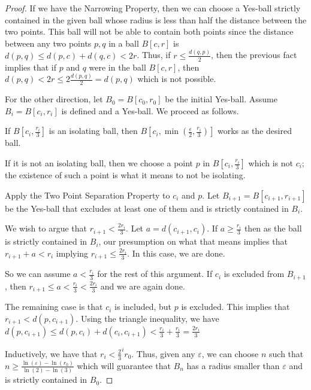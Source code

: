 \documentclass[12pt]{article}
\begin{document}
\begin{proof}

If we have the Narrowing Property, then we can choose a Yes-ball strictly contained in the given ball whose radius is less than half the distance between the two points. This ball will not be able to contain both points since the distance between any two points $p, q$ in a ball $B[c, r]$ is $d(p,q) \leq d(p, c) + d(q,c) < 2r$. Thus, if $ r \leq \frac{d(q,p)}{2}$, then the previous fact implies that if $p$ and $q$ were in the ball $B[c, r]$, then $d(p,q) < 2 r \leq 2\frac{d(p,q)}{2} = d(p,q)$ which is not possible. 

For the other direction, let $B_0 = B[c_0, r_0]$ be the initial Yes-ball. Assume $B_i = B[c_i, r_i]$ is defined and a Yes-ball. We proceed as follows. 

If $B[c_i, \frac{r_i}{3}]$ is an isolating ball, then $B[c_i, \min(\frac{\epsilon}{2}, \frac{r_i}{3})]$ works as the desired ball. 

If it is not an isolating ball, then we choose a point $p$ in $B[c_i, \frac{r_i}{3}]$ which is not $c_i$; the existence of such a point is what it means to not be isolating.

Apply the Two Point Separation Property to $c_i$ and $p$. Let $B_{i+1} = B[c_{i+1}, r_{i+1}]$  be the Yes-ball that excludes at least one of them and is strictly contained in $B_i$.

We wish to argue that $r_{i +1} < \frac{2r_i}{3}$. Let $a = d(c_{i+1}, c_i)$. If $a \geq \frac{r_i}{3}$ then as the ball is
strictly contained in $B_i$, our presumption on what that means implies that $r_{i+1} + a < r_i$ implying $ r_{i+1} \leq \frac{2 r_i}{3}$. In this case, we are done. 

So we can assume $a < \frac{r_i}{3}$ for the rest of this argument. If $c_i$ is excluded from $B_{i+1}$, then $r_{i+1} \leq a < \frac{r_i}{3} < \frac{2 r_i}{3}$ and we are again done.

The remaining case is that $c_i$ is included, but $p$ is excluded. This implies that $r_{i+1} < d(p, c_{i+1})$. Using the triangle inequality, we have $d(p, c_{i+1}) \leq d(p, c_i) + d(c_i, c_{i+1}) < \frac{r_i}{3} + \frac{r_i}{3} = \frac{2r_i}{3}$ 

Inductively, we have that $r_i < \frac{2}{3}^i r_0$. Thus, given any $\varepsilon$, we can choose $n$ such that $n \geq \frac{\ln(\varepsilon) - \ln(r_0)}{\ln(2) - \ln(3)}$ which will guarantee that $B_n$ has a radius smaller than $\varepsilon$ and is strictly contained in $B_0$.
\end{proof}
\end{document}

